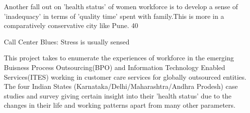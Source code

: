 Another fall out on 'health status' of women workforce is to develop a sense of 'inadequacy' in terms of 'quality time' spent with family.This is more in a comparatively conservative city like Pune. 40%

Call Center Blues:
Stress is usually sensed

This project takes to enumerate the experiences of workforce in the emerging Buisness Process Outsourcing(BPO) and Information Technology Enabled Services(ITES) working in customer care services for globally outsourced entities. The four Indian States (Karnataka/Delhi/Maharashtra/Andhra Prodesh) case studies and survey giving certain insight into their 'health status' due to the changes in their life and working patterns apart from many other parameters.

